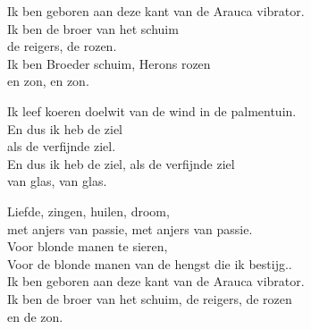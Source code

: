 \clearpage
\begin{translation}
Ik ben geboren aan deze kant van de Arauca vibrator.\\
Ik ben de broer van het schuim\\
de reigers, de rozen.\\
Ik ben Broeder schuim, Herons rozen\\
en zon, en zon.\vspace{\wlskip}

Ik leef koeren doelwit van de wind in de palmentuin.\\
En dus ik heb de ziel\\
als de verfijnde ziel.\\
En dus ik heb de ziel, als de verfijnde ziel\\
van glas, van glas.\vspace{\wlskip}

Liefde, zingen, huilen, droom,\\
met anjers van passie, met anjers van passie.\\
Voor blonde manen te sieren,\\
Voor de blonde manen van de hengst die ik bestijg..\\
Ik ben geboren aan deze kant van de Arauca vibrator.\\
Ik ben de broer van het schuim, de reigers, de rozen\\
en de zon.
\end{translation}
